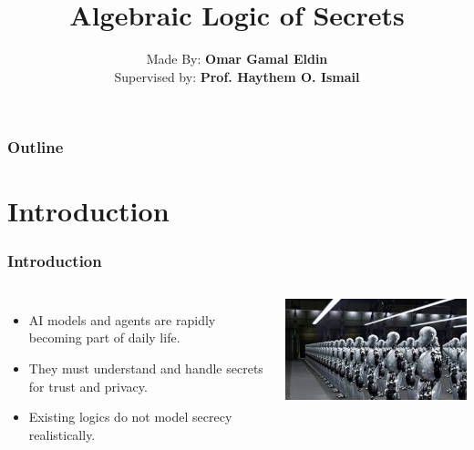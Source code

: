 \documentclass[aspectratio=169]{beamer}
\title{\Huge \textbf{Algebraic Logic of Secrets}}
\author{Made By: \textbf{Omar Gamal Eldin}\\Supervised by: \textbf{Prof. Haythem O. Ismail}}
\institute{}
\date{}
\begin{document}
\frame{\titlepage}


\begin{frame}
\frametitle{Outline}
\tableofcontents[hideallsubsections]
\end{frame}


\section{Introduction}
\begin{frame}
\frametitle{Introduction}

\begin{columns}[c]
    \Large
    \begin{itemize}
        \item AI models and agents are rapidly becoming part of daily life.
        \item They must understand and handle secrets for trust and privacy.
        \item Existing logics do not model secrecy realistically.
    \end{itemize}

    \centering
    \includegraphics[width=\linewidth]{images/irobot3.png}
\end{columns}

\end{frame}
\end{document}
